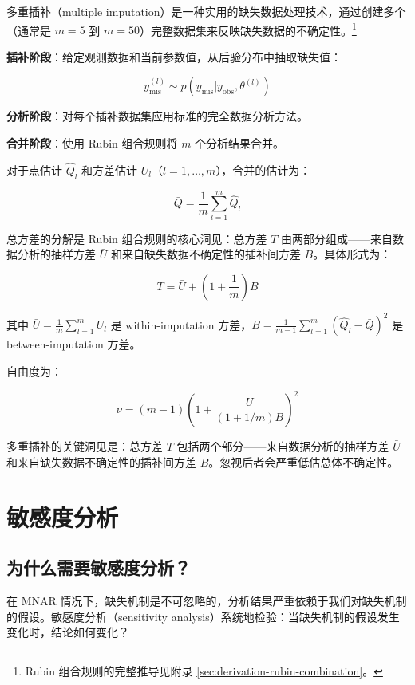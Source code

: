 多重插补（multiple imputation）是一种实用的缺失数据处理技术，通过创建多个（通常是 $m = 5$ 到 $m = 50$）完整数据集来反映缺失数据的不确定性。\footnote{Rubin 组合规则的完整推导见附录 \cref{sec:derivation-rubin-combination}。}

\textbf{插补阶段}：给定观测数据和当前参数值，从后验分布中抽取缺失值：

\[
y_{\text{mis}}^{(l)} \sim p(y_{\text{mis}} | y_{\text{obs}}, \theta^{(l)})
\label{eq:imputation-step}
\]

\textbf{分析阶段}：对每个插补数据集应用标准的完全数据分析方法。

\textbf{合并阶段}：使用 Rubin 组合规则将 $m$ 个分析结果合并。

对于点估计 $\hat{Q}_l$ 和方差估计 $U_l$（$l = 1, \ldots, m$），合并的估计为：

\[
\bar{Q} = \frac{1}{m} \sum_{l=1}^m \hat{Q}_l
\label{eq:rubin-pooled-estimate}
\]

总方差的分解是 Rubin 组合规则的核心洞见：总方差 $T$ 由两部分组成——来自数据分析的抽样方差 $\bar{U}$ 和来自缺失数据不确定性的插补间方差 $B$。具体形式为：

\[
T = \bar{U} + \left(1 + \frac{1}{m}\right) B
\label{eq:rubin-total-variance}
\]

其中 $\bar{U} = \frac{1}{m} \sum_{l=1}^m U_l$ 是 within-imputation 方差，$B = \frac{1}{m-1} \sum_{l=1}^m (\hat{Q}_l - \bar{Q})^2$ 是 between-imputation 方差。

自由度为：

\[
\nu = (m-1)\left(1 + \frac{\bar{U}}{(1 + 1/m)B}\right)^2
\label{eq:rubin-degrees-freedom}
\]

\begin{Remark}
  多重插补的关键洞见是：总方差 $T$ 包括两个部分——来自数据分析的抽样方差 $\bar{U}$ 和来自缺失数据不确定性的插补间方差 $B$。忽视后者会严重低估总体不确定性。
\end{Remark}

\section{敏感度分析}
\label{sec:sensitivity-analysis}

\subsection{为什么需要敏感度分析？}
\label{sec:why-sensitivity-analysis}

在 MNAR 情况下，缺失机制是不可忽略的，分析结果严重依赖于我们对缺失机制的假设。敏感度分析（sensitivity analysis）系统地检验：当缺失机制的假设发生变化时，结论如何变化？

